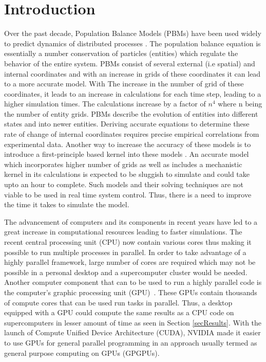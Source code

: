 \documentclass[preprint,10pt,authoryear,review]{elsarticle}
\begin{document}
\section{Introduction}
\label{secIntro}
Over the past decade, Population Balance Models (PBMs) have been used widely to predict 
dynamics of distributed processes \citep{ramkrishna2014}. The population 
balance equation is essentially a number conservation of particles (entities) which 
regulate the behavior of the entire system. PBMs consist of several external (i.e spatial) 
and internal coordinates and with an increase in grids of these coordinates it can lead to
a more accurate model.  With The increase in the number of grid of these coordinates, it 
leads to an increase in calculations for each time step, leading to a higher 
simulation times. The calculations increase by a factor of $n^4$ where n being the 
number of entity grids. PBMs describe the evolution of entities into different states and 
into newer entities. Deriving accurate equations to determine these rate of change 
of internal coordinates requires precise empirical correlations from 
experimental data. Another way to increase the accuracy of these models 
is to introduce a first-principle based kernel into these models \citep{Barrasso2015cerd}. 
An accurate model which incorporates higher number of grids as well as includes a 
mechanistic kernel in its calculations is expected to be sluggish to simulate and could 
take upto an hour \citep{Barrasso2015ces} to complete. Such models and their 
solving techniques are not viable to be used in real time system control. Thus, 
there is a need to improve the time it takes to simulate the model.

The advancement of computers and its components in recent years have led to a great 
increase in computational resources leading to faster simulations. The recent 
central processing unit (CPU) now contain various cores thus making it possible to 
run multiple processes in parallel. 
In order to take advantage of a highly parallel framework, large number of cores are required  
which may not be possible in a personal desktop and a supercomputer cluster would be needed.
Another computer component that can to be used to run a highly parallel code is the computer's 
graphic processing unit (GPU)~\citep{Prakash2013b}. These GPUs contain thousands of compute 
cores that can be used run tasks in parallel. Thus, a desktop equipped with a GPU could 
compute the same results as a CPU code on supercomputers in lesser amount of time as seen 
in Section \ref{secResults}. With the launch of Compute Unified Device Architecture (CUDA), 
NVIDIA made it easier to use GPUs for general parallel programming in an approach usually 
termed as general purpose computing on GPUs (GPGPUs).
\end{document}
